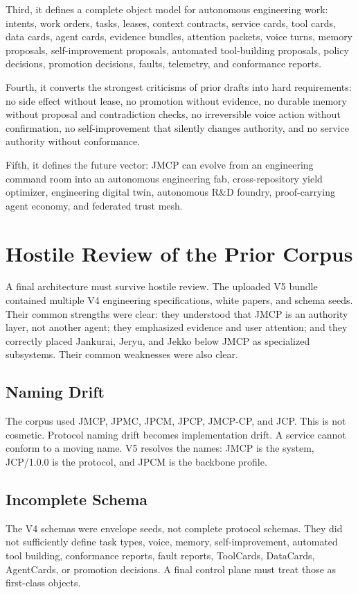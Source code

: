 \documentclass[12pt,journal,onecolumn,draftclsnofoot]{IEEEtran}
\begin{document}
Third, it defines a complete object model for autonomous engineering work: intents, work orders, tasks, leases, context contracts, service cards, tool cards, data cards, agent cards, evidence bundles, attention packets, voice turns, memory proposals, self-improvement proposals, automated tool-building proposals, policy decisions, promotion decisions, faults, telemetry, and conformance reports.

Fourth, it converts the strongest criticisms of prior drafts into hard requirements: no side effect without lease, no promotion without evidence, no durable memory without proposal and contradiction checks, no irreversible voice action without confirmation, no self-improvement that silently changes authority, and no service authority without conformance.

Fifth, it defines the future vector: JMCP can evolve from an engineering command room into an autonomous engineering fab, cross-repository yield optimizer, engineering digital twin, autonomous R\&D foundry, proof-carrying agent economy, and federated trust mesh.

\section{Hostile Review of the Prior Corpus}
A final architecture must survive hostile review. The uploaded V5 bundle contained multiple V4 engineering specifications, white papers, and schema seeds. Their common strengths were clear: they understood that JMCP is an authority layer, not another agent; they emphasized evidence and user attention; and they correctly placed Jankurai, Jeryu, and Jekko below JMCP as specialized subsystems. Their common weaknesses were also clear.

\subsection{Naming Drift}
The corpus used JMCP, JPMC, JPCM, JPCP, JMCP-CP, and JCP. This is not cosmetic. Protocol naming drift becomes implementation drift. A service cannot conform to a moving name. V5 resolves the names: JMCP is the system, JCP/1.0.0 is the protocol, and JPCM is the backbone profile.

\subsection{Incomplete Schema}
The V4 schemas were envelope seeds, not complete protocol schemas. They did not sufficiently define task types, voice, memory, self-improvement, automated tool building, conformance reports, fault reports, ToolCards, DataCards, AgentCards, or promotion decisions. A final control plane must treat those as first-class objects.
\end{document}
